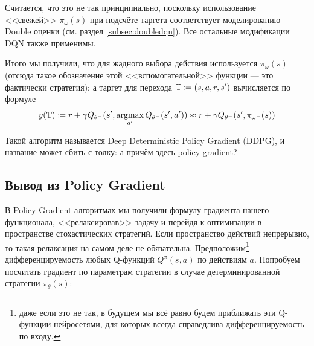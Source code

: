 \begin{remark}
Считается, что это не так принципиально, поскольку использование <<свежей>> $\pi_{\omega}(s)$ при подсчёте таргета соответствует моделированию Double оценки (см. раздел \ref{subsec:doubledqn}). Все остальные модификации DQN также применимы.
\end{remark}

Итого мы получили, что для жадного выбора действия используется $\pi_{\omega}(s)$ (отсюда такое обозначение этой <<вспомогательной>> функции --- это фактически стратегия); а таргет для перехода $\mathbb{T} \coloneqq (s, a, r, s')$ вычисляется по формуле
$$y(\mathbb{T}) \coloneqq r + \gamma Q_{\theta^{-}}(s', \mathop{\mathrm{argmax}}_{a'} Q_{\theta^{-}}(s', a')) \approx r + \gamma Q_{\theta^{-}}(s', \pi_{\omega^{-}}(s))$$

Такой алгоритм называется Deep Deterministic Policy Gradient (DDPG), и название может сбить с толку: а причём здесь policy gradient?

\subsection{Вывод из Policy Gradient}


В Policy Gradient алгоритмах мы получили формулу градиента нашего функционала, <<релаксировав>> задачу и перейдя к оптимизации в пространстве стохастических стратегий. Если пространство действий непрерывно, то такая релаксация на самом деле не обязательна. Предположим\footnote{даже если это не так, в будущем мы всё равно будем приближать эти Q-функции нейросетями, для которых всегда справедлива дифференцируемость по входу.} дифференцируемость любых Q-функций $Q^{\pi}(s, a)$ по действиям $a$. Попробуем посчитать градиент по параметрам стратегии в случае детерминированной стратегии $\pi_\theta(s)$:

